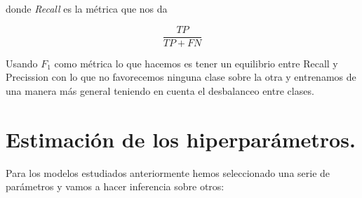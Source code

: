 \documentclass[11pt]{article}
\begin{document}
donde \textit{Recall} es la métrica que nos da 

\[
    \frac{TP}{TP+FN}
\]

Usando $F_1$ como métrica lo que hacemos es tener un equilibrio entre Recall y
Precission con lo que no favorecemos ninguna clase sobre la otra y entrenamos de
una manera más general teniendo en cuenta el desbalanceo entre clases.

\section{Estimación de los hiperparámetros.}


Para los modelos estudiados anteriormente hemos seleccionado una serie de
parámetros y vamos a hacer inferencia sobre otros:
\end{document}
